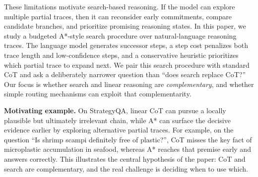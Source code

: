 \documentclass[11pt]{article}
\begin{document}
These limitations motivate search-based reasoning. If the model can explore multiple partial traces, then it can reconsider early commitments, compare candidate branches, and prioritize promising reasoning states. In this paper, we study a budgeted A*-style search procedure over natural-language reasoning traces. The language model generates successor steps, a step cost penalizes both trace length and low-confidence steps, and a conservative heuristic prioritizes which partial trace to expand next. We pair this search procedure with standard CoT and ask a deliberately narrower question than ``does search replace CoT?'' Our focus is whether search and linear reasoning are \emph{complementary}, and whether simple routing mechanisms can exploit that complementarity.





\textbf{Motivating example.} On StrategyQA, linear CoT can pursue a locally plausible but ultimately irrelevant chain, while A* can surface the decisive evidence earlier by exploring alternative partial traces. For example, on the question ``Is shrimp scampi definitely free of plastic?'', CoT misses the key fact of microplastic accumulation in seafood, whereas A* reaches that premise early and answers correctly. This illustrates the central hypothesis of the paper: CoT and search are complementary, and the real challenge is deciding when to use which.


\end{document}
